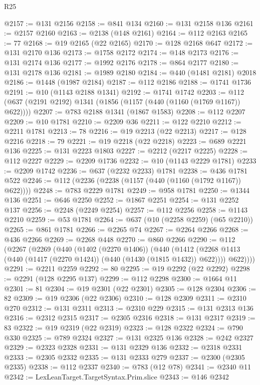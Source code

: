 \begin{lexlean}{R25}
\begin{coremodule}
{{{{{{{{{{{{{{{{{{{{{{{{{{{{{{{{{{{{{{{{{{{{{{{{{{{{{{{{{{{{{{{{{{{{{{{{{{{{{{{{{{{{{{{{{{{{{{{{{{{{{{{{{{{{{{{{{{{{{{{{{{{{{{{{{{{{{{{{{{{{{{{{{{{{{{{{{{{{{{{{{{{{{{{{{{{{{{{{{{{{{{{{{{{{{{{{{{{{{{{@2157 := @131 @2156
@2158 := @841 @134
@2160 := @131 @2158 @136
@2161 := @2157 @2160
@2163 := @2138 (@148 @2161)
@2164 := @112 @2163
@2165 := 77
@2168 := @19 @2165 (@22 @2165)
@2170 := @128 @2168 @647
@2172 := @131 @2170 @136
@2173 := @1758 @2172
@2174 := @148 @2173
@2176 := @131 @2174 @136
@2177 := @1992 @2176
@2178 := @864 @2177
@2180 := @131 @2178 @136
@2181 := @1989 @2180
@2184 := @440 (@1481 @2181) @2018
@2186 := @1448 (@1987 @2184)
@2187 := @112 @2186
@2188 := @1741 @1736
@2191 := @10 (@1143 @2188 @1341)
@2192 := @1741 @1742
@2203 := @112 (@637 (@2191 @2192) @1341 (@1856 (@1157 (@440 (@1160 (@1769 @1167)) @622))))
@2207 := @783 @2188 @1341 (@1867 @1583)
@2208 := @112 @2207
@2209 := @10 @1781
@2210 := @2209 @36
@2211 := @122 @2210
@2212 := @2211 @1781
@2213 := 78
@2216 := @19 @2213 (@22 @2213)
@2217 := @128 @2216
@2218 := 79
@2221 := @19 @2218 (@22 @2218)
@2223 := @689 @2221 @136
@2225 := @131 @2223 @1803
@2227 := @2212 (@2217 @2225)
@2228 := @112 @2227
@2229 := @2209 @1736
@2232 := @10 (@1143 @2229 @1781)
@2233 := @2209 @1742
@2236 := @637 (@2232 @2233) @1781
@2238 := @436 @1781 @522
@2246 := @112 (@2236 (@2238 (@1157 (@440 (@1160 (@1792 @1167)) @622))))
@2248 := @783 @2229 @1781
@2249 := @958 @1781
@2250 := @1344 @136
@2251 := @646 @2250
@2252 := @1867 @2251
@2254 := @131 @2252 @137
@2256 := @2248 (@2249 @2254)
@2257 := @112 @2256
@2258 := @1143 @2210
@2259 := @53 @1781
@2264 := @637 (@10 (@2258 @2259) (@65 @2210))
@2265 := @861 @1781
@2266 := @2265 @74
@2267 := @2264 @2266
@2268 := @436 @2266
@2269 := @2268 @448
@2270 := @860 @2266
@2290 := @112
    (@2267
      (@2269
        (@440
          (@1402 (@2270 @1406))
          (@440
            (@1412 (@2268 @1413 (@440 (@1417 (@2270 @1424)) (@440 (@1430 (@1815 @1432)) @622))))
            @622))))
@2291 := @2211 @2259
@2292 := 80
@2295 := @19 @2292 (@22 @2292)
@2298 := @2291 (@128 @2295 @137)
@2299 := @112 @2298
@2300 := @1664 @11
@2301 := 81
@2304 := @19 @2301 (@22 @2301)
@2305 := @128 @2304
@2306 := 82
@2309 := @19 @2306 (@22 @2306)
@2310 := @128 @2309
@2311 := @2310 @270
@2312 := @131 @2311
@2313 := @2310 @229
@2315 := @131 @2313 @136
@2316 := @2312 @2315
@2317 := @2305 @2316
@2318 := @131 @2317
@2319 := 83
@2322 := @19 @2319 (@22 @2319)
@2323 := @128 @2322
@2324 := @790 @330
@2325 := @789 @2324
@2327 := @131 @2325 @136
@2328 := @242 @2327
@2329 := @2323 @2328
@2331 := @131 @2329 @136
@2332 := @2318 @2331
@2333 := @2305 @2332
@2335 := @131 @2333 @279
@2337 := @2300 (@2305 @2335)
@2338 := @112 @2337
@2340 := @783 (@12 @78)
@2341 := @2340 @11
@2342 := LexLeanTarget.TargetSyntax.Prim.slice
@2343 := @146 @2342
}}}}}}}}}}}}}}}}}}}}}}}}}}}}}}}}}}}}}}}}}}}}}}}}}}}}}}}}}}}}}}}}}}}}}}}}}}}}}}}}}}}}}}}}}}}}}}}}}}}}}}}}}}}}}}}}}}}}}}}}}}}}}}}}}}}}}}}}}}}}}}}}}}}}}}}}}}}}}}}}}}}}}}}}}}}}}}}}}}}}}}}}}}}}}}}}}}}}}}}
\end{coremodule}
\end{lexlean}
